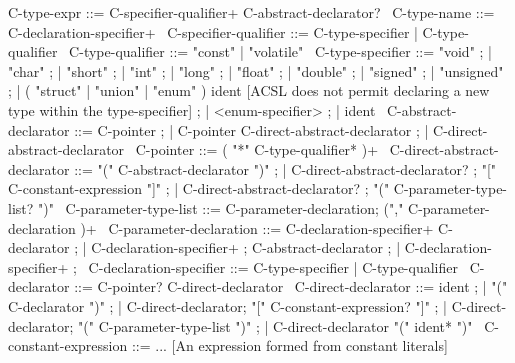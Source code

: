 \begin{syntax}
C-type-expr ::= C-specifier-qualifier+ C-abstract-declarator?
\
C-type-name ::= C-declaration-specifier+
\
C-specifier-qualifier ::= C-type-specifier | C-type-qualifier
\
C-type-qualifier ::= "const" | "volatile"
\
C-type-specifier ::= "void" ;
                   | "char" ;
                   | "short" ;
                   | "int" ;
                   | "long" ;
                   | "float" ;
                   | "double" ;
                   | "signed" ;
                   | "unsigned" ;
                   | ( "struct" | "union" | "enum" ) ident [ACSL does not permit declaring a new type within the type-specifier] ;
                   | <enum-specifier> ;
                   | ident
\
C-abstract-declarator ::= C-pointer ;
| C-pointer C-direct-abstract-declarator ;
| C-direct-abstract-declarator
\
C-pointer ::= ( "*" C-type-qualifier* )+
\
C-direct-abstract-declarator ::= "(" C-abstract-declarator ")" ; 
| C-direct-abstract-declarator? ;
  "[" C-constant-expression "]" ;
| C-direct-abstract-declarator? ;
  "(" C-parameter-type-list? ")"
\
C-parameter-type-list ::= C-parameter-declaration;
 ("," C-parameter-declaration )+
\
C-parameter-declaration ::= C-declaration-specifier+ C-declarator ;
                          | C-declaration-specifier+ ;
                            C-abstract-declarator ;
                          | C-declaration-specifier+ ;
\
C-declaration-specifier ::= C-type-specifier | C-type-qualifier
\
C-declarator ::= C-pointer? C-direct-declarator
\
C-direct-declarator ::= ident ;
                      | "(" C-declarator ")" ;
                      | C-direct-declarator;
                        "[" C-constant-expression? "]" ;
                      | C-direct-declarator;
                        "(" C-parameter-type-list ")" ;
                      | C-direct-declarator "(" ident* ")"
\
C-constant-expression ::=  ... [An expression formed from constant literals]
\end{syntax}
